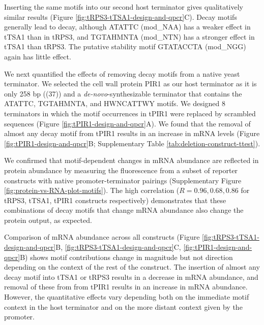 \documentclass{SBCbookchapter}
\begin{document}
Inserting the same motifs into our second host terminator gives qualitatively similar results (Figure \ref{fig:tRPS3-tTSA1-design-and-qpcr}C).
Decay motifs generally lead to decay, although ATATTC (mod\_NAA) has a weaker effect in tTSA1 than in tRPS3, and TGTAHMNTA (mod\_NTN) has a stronger effect in tTSA1 than tRPS3.
The putative stability motif GTATACCTA (mod\_NGG) again has little effect.

We next quantified the effects of removing decay motifs from a native yeast terminator.
We selected the cell wall protein PIR1 as our host terminator as it is only 258 bp ((37)) and a \emph{de-novo}-synthesizable terminator that contains the ATATTC, TGTAHMNTA, and HWNCATTWY motifs.
We designed 8 terminators in which the motif occurrences in tPIR1 were replaced by scrambled sequences (Figure \ref{fig:tPIR1-design-and-qpcr}A).
We found that the removal of almost any decay motif from tPIR1 results in an increase in mRNA levels (Figure \ref{fig:tPIR1-design-and-qpcr}B; Supplementary Table \ref{tab:deletion-construct-ttest}).

We confirmed that motif-dependent changes in mRNA abundance are reflected in protein abundance by measuring the fluorescence from a subset of reporter constructs with native promoter-terminator pairings (Supplementary Figure \ref{fig:protein-vs-RNA-plot-motifs}).
The high correlation (\(R = 0.96, 0.68, 0.86\) for tRPS3, tTSA1, tPIR1 constructs respectively) demonstrates that these combinations of decay motifs that change mRNA abundance also change the protein output, as expected.

Comparison of mRNA abundance across all constructs (Figure \ref{fig:tRPS3-tTSA1-design-and-qpcr}B, \ref{fig:tRPS3-tTSA1-design-and-qpcr}C, \ref{fig:tPIR1-design-and-qpcr}B) shows motif contributions change in magnitude but not direction depending on the context of the rest of the construct.
The insertion of almost any decay motif into tTSA1 or tRPS3 results in a decrease in mRNA abundance, and removal of these from from tPIR1 results in an increase in mRNA abundance.
However, the quantitative effects vary depending both on the immediate motif context in the host terminator and on the more distant context given by the promoter.
\end{document}
